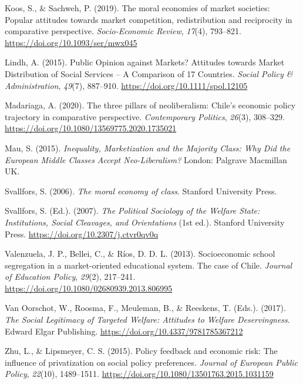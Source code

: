 \documentclass[
  13pt,
]{article}
\newlength{\cslhangindent}
\newenvironment{CSLReferences}[2] %
 {\begin{list}{}{%
  \setlength{\itemindent}{0pt}
  \setlength{\leftmargin}{0pt}
  \setlength{\parsep}{0pt}
  \ifodd #1
   \setlength{\leftmargin}{\cslhangindent}
   \setlength{\itemindent}{-1\cslhangindent}
  \fi
  \setlength{\itemsep}{#2\baselineskip}}}
 {\end{list}}
\begin{document}
\begin{CSLReferences}{1}{0}
Koos, S., \& Sachweh, P. (2019). The moral economies of market
societies: Popular attitudes towards market competition, redistribution
and reciprocity in comparative perspective. \emph{Socio-Economic
Review}, \emph{17}(4), 793--821.
\url{https://doi.org/10.1093/ser/mwx045}

Lindh, A. (2015). Public {Opinion} against {Markets}? {Attitudes}
towards {Market Distribution} of {Social Services} -- {A Comparison} of
17 {Countries}. \emph{Social Policy \& Administration}, \emph{49}(7),
887--910. \url{https://doi.org/10.1111/spol.12105}

Madariaga, A. (2020). The three pillars of neoliberalism: {Chile}'s
economic policy trajectory in comparative perspective.
\emph{Contemporary Politics}, \emph{26}(3), 308--329.
\url{https://doi.org/10.1080/13569775.2020.1735021}

Mau, S. (2015). \emph{Inequality, {Marketization} and the {Majority
Class}: {Why Did} the {European Middle Classes Accept Neo-Liberalism}?}
London: Palgrave Macmillan UK.

Svallfors, S. (2006). \emph{The moral economy of class}. Stanford
University Press.

Svallfors, S. (Ed.). (2007). \emph{The {Political Sociology} of the
{Welfare State}: {Institutions}, {Social Cleavages}, and {Orientations}}
(1st ed.). Stanford University Press.
\url{https://doi.org/10.2307/j.ctvr0qv0q}

Valenzuela, J. P., Bellei, C., \& Ríos, D. D. L. (2013). Socioeconomic
school segregation in a market-oriented educational system. {The} case
of {Chile}. \emph{Journal of Education Policy}, \emph{29}(2), 217--241.
\url{https://doi.org/10.1080/02680939.2013.806995}

Van Oorschot, W., Roosma, F., Meuleman, B., \& Reeskens, T. (Eds.).
(2017). \emph{The {Social Legitimacy} of {Targeted Welfare}: {Attitudes}
to {Welfare Deservingness}}. Edward Elgar Publishing.
\url{https://doi.org/10.4337/9781785367212}

Zhu, L., \& Lipsmeyer, C. S. (2015). Policy feedback and economic risk:
The influence of privatization on social policy preferences.
\emph{Journal of European Public Policy}, \emph{22}(10), 1489--1511.
\url{https://doi.org/10.1080/13501763.2015.1031159}

\end{CSLReferences}
\end{document}
